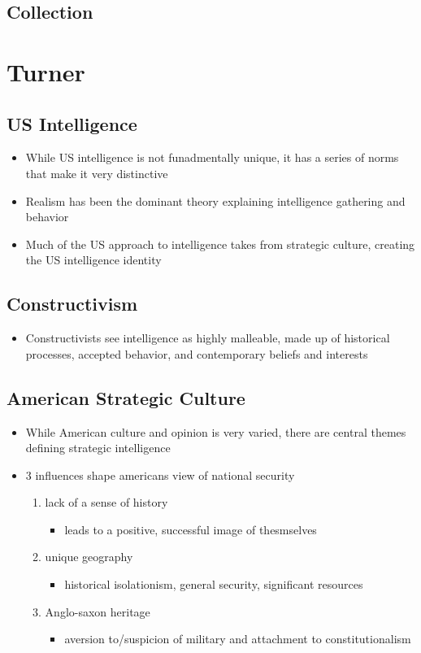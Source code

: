 \documentclass[11pt]{article}
\begin{document}
\subsection{Collection}
\label{sec:org15ebb75}
\section{Turner}
\label{sec:org454f70d}
\subsection{US Intelligence}
\label{sec:org9baa637}
\begin{itemize}
\item While US intelligence is not funadmentally unique, it has a series of norms that make it very distinctive
\item Realism has been the dominant theory explaining intelligence gathering and behavior
\item Much of the US approach to intelligence takes from strategic culture, creating the US intelligence identity
\end{itemize}
\subsection{Constructivism}
\label{sec:org903f2cf}
\begin{itemize}
\item Constructivists see intelligence as highly malleable, made up of historical processes, accepted behavior, and contemporary beliefs and interests
\end{itemize}
\subsection{American Strategic Culture}
\label{sec:orgf7053c0}
\begin{itemize}
\item While American culture and opinion is very varied, there are central themes defining strategic intelligence
\item 3 influences shape americans view of national security
\begin{enumerate}
\item lack of a sense of history
\begin{itemize}
\item leads to a positive, successful image of thesmselves
\end{itemize}
\item unique geography
\begin{itemize}
\item historical isolationism, general security, significant resources
\end{itemize}
\item Anglo-saxon heritage
\begin{itemize}
\item aversion to/suspicion of military and attachment to constitutionalism
\end{itemize}
\end{enumerate}
\end{itemize}
\end{document}
